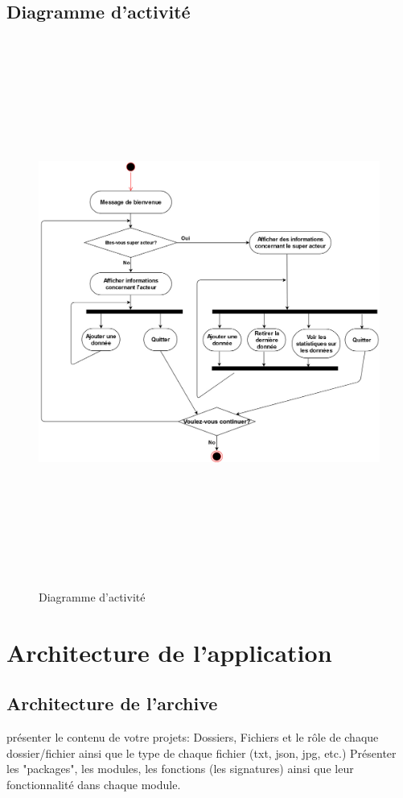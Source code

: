 \documentclass[french]{report}
\begin{document}
\section{Diagramme d'activité}
\begin{figure}[!h]
\includegraphics[width=16cm, height=18cm]{Activity_Diagram.jpg}
\caption{\label{fig:2} Diagramme d'activité}
\end{figure}
\newpage

\chapter{Architecture de l'application}
\section{Architecture de l'archive}
présenter le contenu de votre projets: Dossiers, Fichiers et le rôle de chaque dossier/fichier ainsi que le type de chaque fichier (txt, json, jpg, etc.)
Présenter les "packages", les modules, les fonctions (les signatures) ainsi que leur fonctionnalité dans chaque module.
\end{document}
